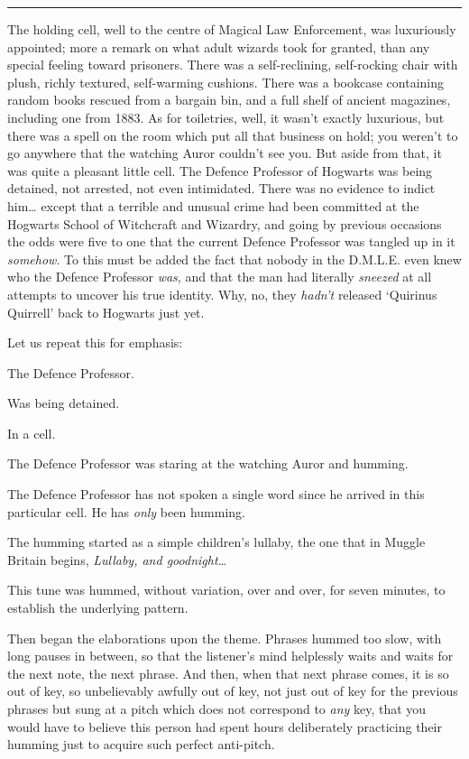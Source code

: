\begin{center}\rule{3in}{0.4pt}\end{center}

The holding cell, well to the centre of Magical Law Enforcement, was
luxuriously appointed; more a remark on what adult wizards took for
granted, than any special feeling toward prisoners. There was a
self-reclining, self-rocking chair with plush, richly textured,
self-warming cushions. There was a bookcase containing random books
rescued from a bargain bin, and a full shelf of ancient magazines,
including one from 1883. As for toiletries, well, it wasn't exactly
luxurious, but there was a spell on the room which put all that business
on hold; you weren't to go anywhere that the watching Auror couldn't see
you. But aside from that, it was quite a pleasant little cell. The
Defence Professor of Hogwarts was being detained, not arrested, not even
intimidated. There was no evidence to indict him\ldots{} except that a
terrible and unusual crime had been committed at the Hogwarts School of
Witchcraft and Wizardry, and going by previous occasions the odds were
five to one that the current Defence Professor was tangled up in it
\emph{somehow}. To this must be added the fact that nobody in the
D.M.L.E. even knew who the Defence Professor \emph{was}, and that the
man had literally \emph{sneezed} at all attempts to uncover his true
identity. Why, no, they \emph{hadn't} released `Quirinus Quirrell' back
to Hogwarts just yet.

Let us repeat this for emphasis:

The Defence Professor.

Was being detained.

In a cell.

The Defence Professor was staring at the watching Auror and humming.

The Defence Professor has not spoken a single word since he arrived in
this particular cell. He has \emph{only} been humming.

The humming started as a simple children's lullaby, the one that in
Muggle Britain begins, \emph{Lullaby, and goodnight\ldots{}}

This tune was hummed, without variation, over and over, for seven
minutes, to establish the underlying pattern.

Then began the elaborations upon the theme. Phrases hummed too slow,
with long pauses in between, so that the listener's mind helplessly
waits and waits for the next note, the next phrase. And then, when that
next phrase comes, it is so out of key, so unbelievably awfully out of
key, not just out of key for the previous phrases but sung at a pitch
which does not correspond to \emph{any} key, that you would have to
believe this person had spent hours deliberately practicing their
humming just to acquire such perfect anti-pitch.

